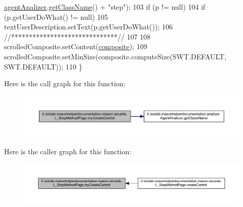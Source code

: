 \begin{DoxyCode}
      \hyperlink{classit_1_1isislab_1_1masonhelperdocumentation_1_1mason_1_1wizards_1_1_l___step_method_page_a0e0b633d8d346100b6ab65b05d9d60e6}{agentAnalizer}.\hyperlink{classit_1_1isislab_1_1masonhelperdocumentation_1_1analizer_1_1_agent_analizer_ace466e16439878a851eb63d5a11ddf43}{getClassName}() + \textcolor{stringliteral}{"step"});
103         \textcolor{keywordflow}{if} (p != null)
104             \textcolor{keywordflow}{if} (p.getUserDoWhat() != null)
105                 textUserDescription.setText(p.getUserDoWhat());
106         \textcolor{comment}{//******************************//}
107         
108         scrolledComposite.setContent(\hyperlink{classit_1_1isislab_1_1masonhelperdocumentation_1_1mason_1_1wizards_1_1_l___step_method_page_a73ff4ee05e8c5b36aed06fa604e32ac2}{composite});
109         scrolledComposite.setMinSize(composite.computeSize(SWT.DEFAULT, SWT.DEFAULT));
110     \}
\end{DoxyCode}


Here is the call graph for this function\-:
\nopagebreak
\begin{figure}[H]
\begin{center}
\leavevmode
\includegraphics[width=350pt]{classit_1_1isislab_1_1masonhelperdocumentation_1_1mason_1_1wizards_1_1_l___step_method_page_aae5b5f889fca35447959d7f5f4f264a7_cgraph}
\end{center}
\end{figure}




Here is the caller graph for this function\-:
\nopagebreak
\begin{figure}[H]
\begin{center}
\leavevmode
\includegraphics[width=350pt]{classit_1_1isislab_1_1masonhelperdocumentation_1_1mason_1_1wizards_1_1_l___step_method_page_aae5b5f889fca35447959d7f5f4f264a7_icgraph}
\end{center}
\end{figure}





